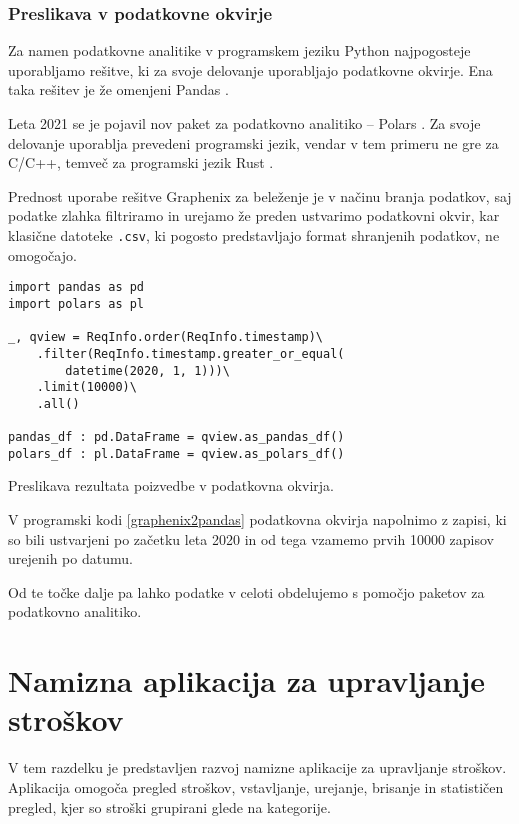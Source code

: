 \documentclass[a4paper,12pt,openright]{book}
\begin{document}
    \subsubsection{Preslikava v podatkovne okvirje}

    Za namen podatkovne analitike v programskem jeziku Python najpogosteje uporabljamo rešitve, ki za svoje delovanje uporabljajo podatkovne okvirje. Ena taka rešitev je že omenjeni Pandas \cite{PANDAS_GITHUB}.
    
    Leta 2021 se je pojavil nov paket za podatkovno analitiko – Polars \cite{POLARS}. Za svoje delovanje uporablja prevedeni programski jezik, vendar v tem primeru ne gre za C/C++, temveč za programski jezik Rust \cite{RUST}.

    Prednost uporabe rešitve Graphenix za beleženje je v načinu branja podatkov, saj podatke zlahka filtriramo in urejamo že preden ustvarimo podatkovni okvir, kar klasične datoteke {\tt .csv}, ki pogosto predstavljajo format shranjenih podatkov, ne omogočajo.

\begin{code}
\begin{verbatim}
import pandas as pd
import polars as pl

_, qview = ReqInfo.order(ReqInfo.timestamp)\
    .filter(ReqInfo.timestamp.greater_or_equal(
        datetime(2020, 1, 1)))\
    .limit(10000)\
    .all()

pandas_df : pd.DataFrame = qview.as_pandas_df()
polars_df : pl.DataFrame = qview.as_polars_df()
\end{verbatim}
\caption{Preslikava rezultata poizvedbe v podatkovna okvirja.}
\label{graphenix2pandas}
\end{code}

    \noindent
    V programski kodi \ref{graphenix2pandas} podatkovna okvirja napolnimo z zapisi, ki so bili ustvarjeni po začetku leta 2020 in od tega vzamemo prvih \num{10000} zapisov urejenih po datumu.

    Od te točke dalje pa lahko podatke v celoti obdelujemo s pomočjo paketov za podatkovno analitiko.

    \newpage
    \section{Namizna aplikacija za upravljanje stroškov}

    V tem razdelku je predstavljen razvoj namizne aplikacije za upravljanje stroškov. Aplikacija omogoča pregled stroškov, vstavljanje, urejanje, brisanje in statističen pregled, kjer so stroški grupirani glede na kategorije.
\end{document}
